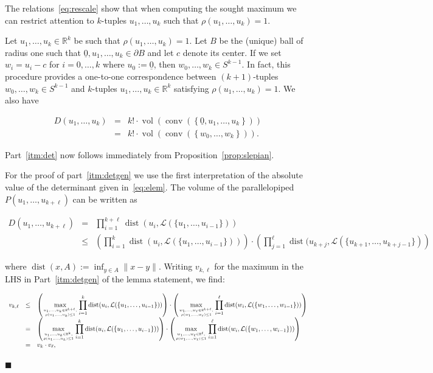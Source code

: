 \documentclass[11pt]{article}%
\newenvironment{proofof}[1]{\vspace{1ex}\noindent{\bf Proof of #1.}}{\hspace*{\fill}$\blacksquare$\vspace{1ex}}
\newcommand{\Lcal}[0]{\ensuremath{{\mathcal L}}}
\newcommand{\eR}[0]{\ensuremath{ \mathbb R}}
\newcommand{\norm}[1]{\ensuremath{\|#1\|}}
\newcommand{\orig}{\underline{0}}
\DeclareMathOperator{\dist}{dist}
\DeclareMathOperator{\conv}{conv}
\DeclareMathOperator{\vol}{vol}
\begin{document}
\begin{proofof}{Lemma~\ref{lem:det}}
The relations~\eqref{eq:rescale} show that when computing the sought maximum we can restrict attention 
to $k$-tuples $u_1,\dots,u_k$ such that 
$\rho(u_1,\dots,u_k)=1$.

Let $u_1,\dots,u_k \in \eR^k$ be such that $\rho(u_1,\dots,u_k)=1$.
Let $B$ be the (unique) ball of radius one such that $\orig, u_1,\dots,u_k \in \partial B$ and let $c$ denote its center.
If we set $w_i = u_i-c$ for $i=0,\dots,k$ where $u_0 := \orig$, then $w_0,\dots,w_k \in S^{k-1}$.
In fact, this procedure provides a one-to-one correspondence between 
$(k+1)$-tuples $w_0,\dots,w_k \in S^{k-1}$ and $k$-tuples $u_1,\dots,u_k \in \eR^k$ satisfying $\rho(u_1,\dots,u_k)=1$.
We also have

$$ \begin{array}{rcl} 
\displaystyle D(u_1,\dots,u_k)
& = & \displaystyle k! \cdot \vol\left(\conv\left(\left\{\orig,u_1,\dots,u_k\right\}\right)\right) \\
& = & \displaystyle k! \cdot \vol\left(\conv\left(\left\{w_0,\dots,w_k\right\}\right)\right). 
\end{array} $$

\noindent
Part~\ref{itm:det} now follows immediately from Proposition~\ref{prop:slepian}.

For the proof of part~\ref{itm:detgen} we use the first interpretation of the absolute value of the determinant 
given in~\eqref{eq:elem}.
The volume of the parallelopiped $P(u_1,\dots,u_{k+\ell})$ can be written as 

$$ \begin{array}{rcl} D(u_1,\dots,u_{k+\ell}) 
& = & \displaystyle 
\prod_{i=1}^{k+\ell} \dist( u_i, \Lcal(\{u_1,\dots,u_{i-1}\}) ) \\
& \leq & \displaystyle 
\left( \prod_{i=1}^{k} \dist( u_i, \Lcal(\{u_1,\dots,u_{i-1}\}) ) \right) \cdot 
\left( \prod_{j=1}^{\ell} \dist( u_{k+j}, \Lcal(\{u_{k+1},\dots,u_{k+j-1}\}) \right)
\end{array} $$

\noindent
where 
$\dist(x,A) := \inf_{y \in A} \norm{x-y}$.
Writing $v_{k,\ell}$ for the maximum in the LHS in Part~\ref{itm:detgen} of the lemma statement, we find:

$$ \begin{array}{rcl} 
v_{k,\ell}
& \leq & \displaystyle 
\left( \max_{u_1,\dots,u_k \in \eR^{k+\ell},\atop\rho(u_1,\dots,u_{k})\leq 1}
\prod_{i=1}^{k} \dist( u_i, \Lcal(\{u_1,\dots,u_{i-1}\}) ) \right) \cdot
\left( \max_{w_1,\dots,w_\ell \in \eR^{k+\ell},\atop\rho(w_1,\dots,w_{\ell})\leq 1}
\prod_{i=1}^{\ell} \dist( w_i, \Lcal(\{w_1,\dots,w_{i-1}\}) ) \right) \\
& = & \displaystyle 
\left( \max_{u_1,\dots,u_k \in \eR^{k},\atop\rho(u_1,\dots,u_{k})\leq 1}
\prod_{i=1}^{k} \dist( u_i, \Lcal(\{u_1,\dots,u_{i-1}\}) ) \right) \cdot
\left( \max_{w_1,\dots,w_\ell \in \eR^{\ell},\atop\rho(w_1,\dots,w_{\ell})\leq 1}
\prod_{i=1}^{\ell} \dist( w_i, \Lcal(\{w_1,\dots,w_{i-1}\}) ) \right) \\
& = & v_k \cdot v_\ell,
   \end{array} $$


\end{proofof}
\end{document}
